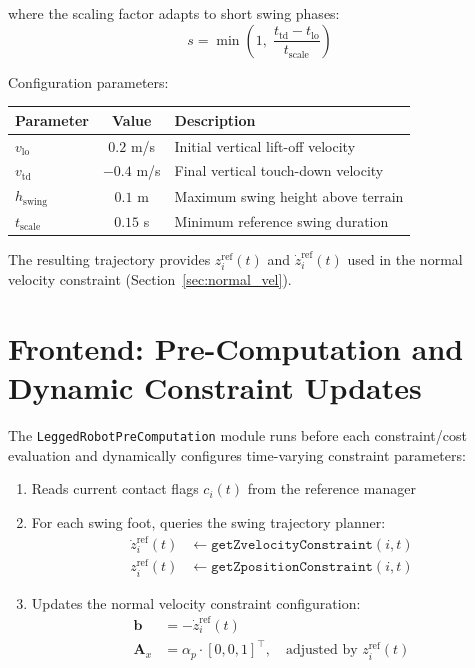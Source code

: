 \documentclass[11pt,a4paper]{article}
\begin{document}
where the scaling factor adapts to short swing phases:
\begin{equation}
	s = \min\left(1,\; \frac{t_{\text{td}} - t_{\text{lo}}}{t_{\text{scale}}}\right)
\end{equation}

Configuration parameters:
\begin{center}
	\begin{tabular}{lcl}
		\toprule
		Parameter          & Value      & Description                        \\
		\midrule
		$v_{\text{lo}}$    & $0.2$ m/s  & Initial vertical lift-off velocity \\
		$v_{\text{td}}$    & $-0.4$ m/s & Final vertical touch-down velocity \\
		$h_{\text{swing}}$ & $0.1$ m    & Maximum swing height above terrain \\
		$t_{\text{scale}}$ & $0.15$ s   & Minimum reference swing duration   \\
		\bottomrule
	\end{tabular}
\end{center}

The resulting trajectory provides $z_i^{\text{ref}}(t)$ and $\dot{z}_i^{\text{ref}}(t)$ used in the normal velocity constraint (Section~\ref{sec:normal_vel}).


\section{Frontend: Pre-Computation and Dynamic Constraint Updates}
\label{sec:precomp}

The \texttt{LeggedRobotPreComputation} module runs before each constraint/cost evaluation and dynamically configures time-varying constraint parameters:

\begin{enumerate}
	\item Reads current contact flags $c_i(t)$ from the reference manager
	\item For each swing foot, queries the swing trajectory planner:
	      \begin{align}
		      \dot{z}_i^{\text{ref}}(t) & \leftarrow \texttt{getZvelocityConstraint}(i, t) \\
		      z_i^{\text{ref}}(t)       & \leftarrow \texttt{getZpositionConstraint}(i, t)
	      \end{align}
	\item Updates the normal velocity constraint configuration:
	      \begin{align}
		      \bm{b}   & = -\dot{z}_i^{\text{ref}}(t)                                                   \\
		      \bm{A}_x & = \alpha_p \cdot [0, 0, 1]^\top, \quad \text{adjusted by } z_i^{\text{ref}}(t)
	      \end{align}
\end{enumerate}
\end{document}
